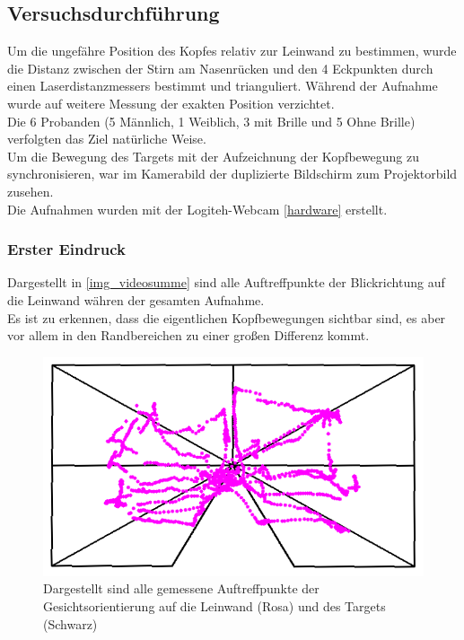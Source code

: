 \subsection{Versuchsdurchführung}
Um die ungefähre Position des Kopfes relativ zur Leinwand zu bestimmen, wurde die Distanz zwischen der Stirn am Nasenrücken und den 4 Eckpunkten durch einen Laserdistanzmessers bestimmt und trianguliert. Während der Aufnahme wurde auf weitere Messung der exakten Position verzichtet.\\
Die 6 Probanden (5 Männlich, 1 Weiblich, 3 mit Brille und 5 Ohne Brille) verfolgten das Ziel natürliche Weise.\\
Um die Bewegung des Targets mit der Aufzeichnung der Kopfbewegung zu synchronisieren, war im Kamerabild der duplizierte Bildschirm zum Projektorbild zusehen.\\
Die Aufnahmen wurden mit der Logiteh-Webcam \autoref{hardware} erstellt.
\subsubsection{Erster Eindruck}
Dargestellt in \autoref{img_videosumme} sind alle Auftreffpunkte der Blickrichtung auf die Leinwand währen der gesamten Aufnahme.\\
Es ist zu erkennen, dass die eigentlichen Kopfbewegungen sichtbar sind, es aber vor allem in den Randbereichen zu einer großen Differenz kommt.\\
\begin{figure}
	\centering
	\includegraphics[width=0.7\linewidth]{OpenFace_Img/VideoSumme}
	\caption{Dargestellt sind alle gemessene Auftreffpunkte der Gesichtsorientierung auf die Leinwand (Rosa) und des Targets (Schwarz)}
	\label{img_videosumme}
\end{figure}
